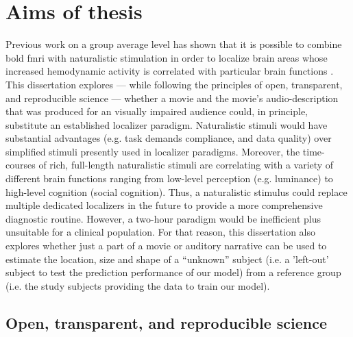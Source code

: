 

\section{Aims of thesis}

%
Previous work on a group average level has shown that it is possible to combine
\ac{bold} \ac{fmri} with naturalistic stimulation in order to localize brain
areas whose increased hemodynamic activity is correlated with particular brain
functions \citep{bartels2004mapping}.
%
This dissertation explores --- while following the principles of open,
transparent, and reproducible science --- whether a movie and the movie's
audio-description that was produced for an visually impaired audience could, in
principle, substitute an established localizer paradigm.
%
Naturalistic stimuli would have substantial advantages (e.g. task demands
compliance, and data quality) over simplified stimuli presently used in
localizer paradigms.
%
Moreover, the time-courses of rich, full-length naturalistic stimuli are
correlating with a variety of different brain functions ranging from low-level
perception (e.g.  luminance) to high-level cognition (social cognition).
%
Thus, a naturalistic stimulus could replace multiple dedicated localizers in the
future to provide a more comprehensive diagnostic routine.
%
However, a two-hour paradigm would be inefficient plus unsuitable for a clinical
population.
%
For that reason, this dissertation also explores whether just a part of a movie
or auditory narrative can be used to estimate the location, size and shape of a
``unknown'' subject (i.e. a 'left-out' subject to test the prediction
performance of our model) from a reference group (i.e. the study subjects
providing the data to train our model).


\subsection{Open, transparent, and reproducible science}


